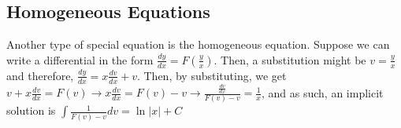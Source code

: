 \documentclass{article}
\begin{document}
\subsection{Homogeneous Equations}

Another type of special equation is the homogeneous equation. Suppose we can write a differential in the form $\frac{dy}{dx} = F(\frac{y}{x})$. Then, a substitution might be $v = \frac{y}{x}$ and therefore, $\frac{dy}{dx} = x\frac{dv}{dx} + v$. Then, by substituting, we get $v + x\frac{dv}{dx} = F(v) \rightarrow x\frac{dv}{dx} = F(v) - v \rightarrow \frac{\frac{dv}{dx}}{F(v) - v} = \frac{1}{x}$, and as such, an implicit solution is $\int \frac{1}{F(v) - v} dv = \ln \vert x \vert + C$
\end{document}
